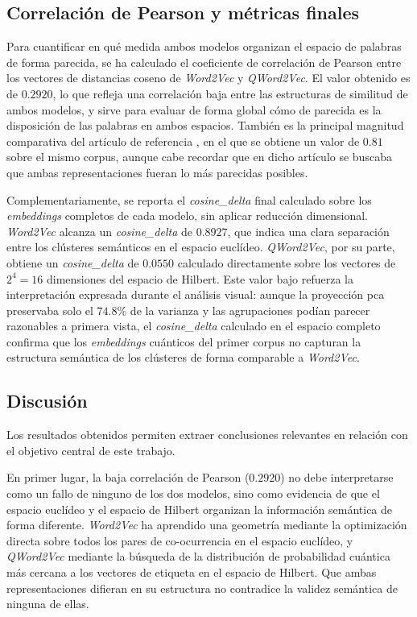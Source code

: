 \subsection{Correlación de Pearson y métricas finales}

Para cuantificar en qué medida ambos modelos organizan el espacio de palabras de forma parecida, se ha calculado el coeficiente de correlación de Pearson entre los vectores de distancias coseno de \textit{Word2Vec} y \textit{QWord2Vec}. El valor obtenido es de $0.2920$, lo que refleja una correlación baja entre las estructuras de similitud de ambos modelos, y sirve para evaluar de forma global cómo de parecida es la disposición de las palabras en ambos espacios. También es la principal magnitud comparativa del artículo de referencia \cite{ohno_qword2vec_2025}, en el que se obtiene un valor de $0.81$ sobre el mismo corpus, aunque cabe recordar que en dicho artículo se buscaba que ambas representaciones fueran lo más parecidas posibles.

Complementariamente, se reporta el \textit{cosine\_delta} final calculado sobre los \textit{embeddings} completos de cada modelo, sin aplicar reducción dimensional. \textit{Word2Vec} alcanza un \textit{cosine\_delta} de $0.8927$, que indica una clara separación entre los clústeres semánticos en el espacio euclídeo. \textit{QWord2Vec}, por su parte, obtiene un \textit{cosine\_delta} de $0.0550$ calculado directamente sobre los vectores de $2^4 = 16$ dimensiones del espacio de Hilbert. Este valor bajo refuerza la interpretación expresada durante el análisis visual: aunque la proyección \gls{pca} preservaba solo el $74.8\%$ de la varianza y las agrupaciones podían parecer razonables a primera vista, el \textit{cosine\_delta} calculado en el espacio completo confirma que los \textit{embeddings} cuánticos del primer corpus no capturan la estructura semántica de los clústeres de forma comparable a \textit{Word2Vec}.

\subsection{Discusión}

Los resultados obtenidos permiten extraer conclusiones relevantes en relación con el objetivo central de este trabajo.

En primer lugar, la baja correlación de Pearson ($0.2920$) no debe interpretarse como un fallo de ninguno de los dos modelos, sino como evidencia de que el espacio euclídeo y el espacio de Hilbert organizan la información semántica de forma diferente. \textit{Word2Vec} ha aprendido una geometría mediante la optimización directa sobre todos los pares de co-ocurrencia en el espacio euclídeo, y \textit{QWord2Vec} mediante la búsqueda de la distribución de probabilidad cuántica más cercana a los vectores de etiqueta en el espacio de Hilbert. Que ambas representaciones difieran en su estructura no contradice la validez semántica de ninguna de ellas.

